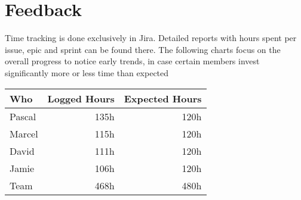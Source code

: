 \chapter{Feedback}

Time tracking is done exclusively in Jira.
Detailed reports with hours spent per issue, epic and sprint can be found there.
The following charts focus on the overall progress to notice early trends, in case certain members invest significantly more or less time than expected


\begin{table}[H]
    \begin{tabular}{l|r|r}
        \textbf{Who} & \textbf{Logged Hours} & \textbf{Expected Hours} \\
        \hline
        Pascal & 135h & 120h \\
        Marcel & 115h & 120h \\
        David  & 111h & 120h \\
        Jamie  & 106h & 120h \\
        \hline
        Team   & 468h & 480h
    \end{tabular}
\end{table}
